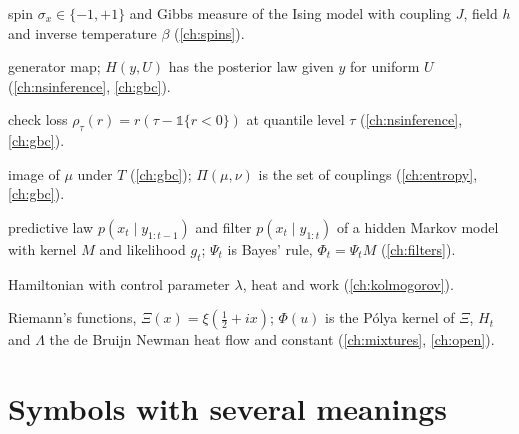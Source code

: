 \begin{description}[leftmargin=2.2em,labelwidth=1.8em,labelsep=0.4em,itemsep=0pt,parsep=0pt]
\item[$\sigma_x,\ \mu_{\beta,h}$] spin $\sigma_x\in\{-1,+1\}$ and Gibbs measure of the Ising model with coupling $J$, field $h$ and inverse temperature $\beta$ (\ref{ch:spins}).
\item[$H(y,u)$] generator map; $H(y,U)$ has the posterior law given $y$ for uniform $U$ (\ref{ch:nsinference}, \ref{ch:gbc}).
\item[$\rho_\tau$] check loss $\rho_\tau(r)=r(\tau-\mathbb{1}\{r<0\})$ at quantile level $\tau$ (\ref{ch:nsinference}, \ref{ch:gbc}).
\item[$T_\#\mu$] image of $\mu$ under $T$ (\ref{ch:gbc}); $\Pi(\mu,\nu)$ is the set of couplings (\ref{ch:entropy}, \ref{ch:gbc}).
\item[$\eta_t,\ \pi_t$] predictive law $p(x_t\mid y_{1:t-1})$ and filter $p(x_t\mid y_{1:t})$ of a hidden Markov model with kernel $M$ and likelihood $g_t$; $\Psi_t$ is Bayes' rule, $\Phi_t=\Psi_tM$ (\ref{ch:filters}).
\item[$\mathcal H_\lambda,\ Q,\ W$] Hamiltonian with control parameter $\lambda$, heat and work (\ref{ch:kolmogorov}).
\item[$\xi,\ \Xi$] Riemann's functions, $\Xi(x)=\xi(\frac12+ix)$; $\Phi(u)$ is the P\'olya kernel of $\Xi$, $H_t$ and $\Lambda$ the de Bruijn Newman heat flow and constant (\ref{ch:mixtures}, \ref{ch:open}).
\end{description}

\section*{Symbols with several meanings}

